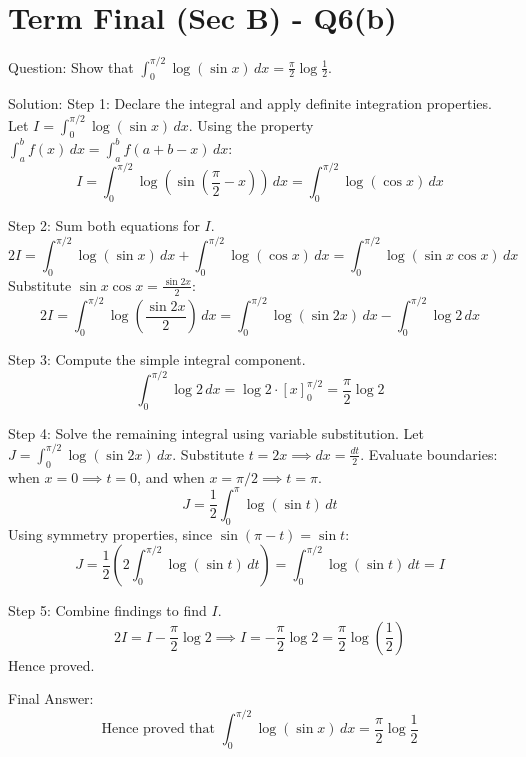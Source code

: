 \documentclass{article}
\begin{document}
\section*{Term Final (Sec B) - Q6(b)}
Question:
Show that \(\int_0^{\pi/2} \log(\sin x) \, dx = \frac{\pi}{2} \log \frac{1}{2}\).

Solution:
Step 1: Declare the integral and apply definite integration properties.
Let \(I = \int_0^{\pi/2} \log(\sin x) \, dx\).
Using the property \(\int_a^b f(x) \, dx = \int_a^b f(a+b-x) \, dx\):
\[
I = \int_0^{\pi/2} \log\left(\sin\left(\frac{\pi}{2} - x\right)\right) \, dx = \int_0^{\pi/2} \log(\cos x) \, dx
\]

Step 2: Sum both equations for \(I\).
\[
2I = \int_0^{\pi/2} \log(\sin x) \, dx + \int_0^{\pi/2} \log(\cos x) \, dx = \int_0^{\pi/2} \log(\sin x \cos x) \, dx
\]
Substitute \(\sin x \cos x = \frac{\sin 2x}{2}\):
\[
2I = \int_0^{\pi/2} \log\left(\frac{\sin 2x}{2}\right) \, dx = \int_0^{\pi/2} \log(\sin 2x) \, dx - \int_0^{\pi/2} \log 2 \, dx
\]

Step 3: Compute the simple integral component.
\[
\int_0^{\pi/2} \log 2 \, dx = \log 2 \cdot [x]_0^{\pi/2} = \frac{\pi}{2} \log 2
\]

Step 4: Solve the remaining integral using variable substitution.
Let \(J = \int_0^{\pi/2} \log(\sin 2x) \, dx\).
Substitute \(t = 2x \implies dx = \frac{dt}{2}\).
Evaluate boundaries: when \(x = 0 \implies t = 0\), and when \(x = \pi/2 \implies t = \pi\).
\[
J = \frac{1}{2} \int_0^{\pi} \log(\sin t) \, dt
\]
Using symmetry properties, since \(\sin(\pi - t) = \sin t\):
\[
J = \frac{1}{2} \left( 2 \int_0^{\pi/2} \log(\sin t) \, dt \right) = \int_0^{\pi/2} \log(\sin t) \, dt = I
\]

Step 5: Combine findings to find \(I\).
\[
2I = I - \frac{\pi}{2} \log 2 \implies I = -\frac{\pi}{2} \log 2 = \frac{\pi}{2} \log\left(\frac{1}{2}\right)
\]
Hence proved.

Final Answer:
\[
\text{Hence proved that } \boxed{\int_0^{\pi/2} \log(\sin x) \, dx = \frac{\pi}{2} \log \frac{1}{2}}
\]

\end{document}
